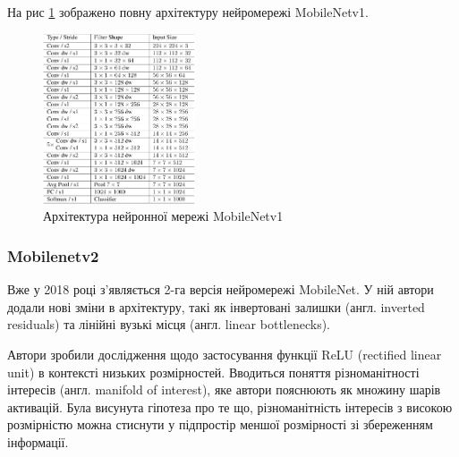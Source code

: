 На рис \ref{fig:cnn:mobilenetv1_architecture} зображено повну архітектуру нейромережі MobileNetv1.

\begin{figure}[H]
    \centering
    \includegraphics[width=0.4\textwidth]{images/cnn_mobilenetv1_architecture}
    \caption{Архітектура нейронної мережі MobileNetv1   \cite{mobilenetv1}
        \label{fig:cnn:mobilenetv1_architecture}
    }
\end{figure}

\subsubsection{Mobilenetv2}

Вже у 2018 році з'являється 2-га версія нейромережі MobileNet. У ній автори додали нові зміни в
архітектуру, такі як інвертовані залишки (англ. inverted residuals) та
лінійні вузькі місця (англ. linear bottlenecks).

Автори зробили дослідження щодо застосування функції ReLU (rectified linear unit) в
контексті низьких розмірностей. Вводиться поняття різноманітності інтересів  (англ. manifold of interest),
яке автори пояснюють як множину шарів активацій. Була висунута гіпотеза про те що,
різноманітність інтересів з високою розмірністю можна стиснути у підпростір меншої розмірності
зі збереженням інформації.

